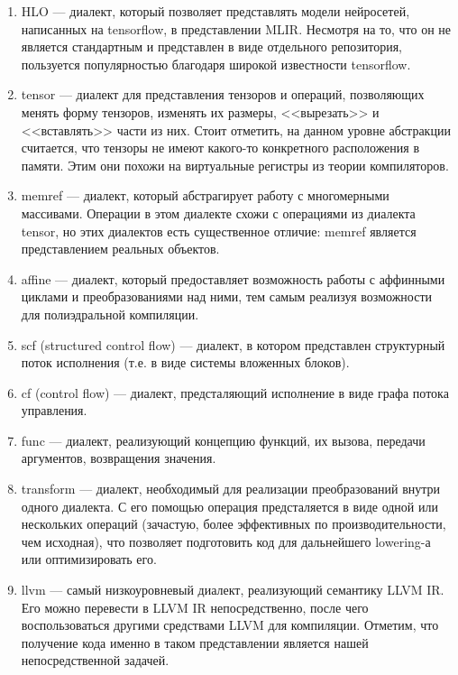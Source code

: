 \begin{enumerate}
    \item HLO --- диалект, который позволяет представлять модели нейросетей,
          написанных на tensorflow, в представлении MLIR. Несмотря на то,
          что он не является стандартным и представлен в виде отдельного
          репозитория, пользуется популярностью благодаря широкой
          известности tensorflow.

    \item tensor --- диалект для представления тензоров и операций,
          позволяющих менять форму тензоров, изменять их размеры,
          <<вырезать>> и <<вставлять>> части из них. Стоит отметить, на
          данном уровне абстракции считается, что тензоры не имеют какого-то
          конкретного расположения в памяти. Этим они похожи на виртуальные
          регистры из теории компиляторов.

    \item memref --- диалект, который абстрагирует работу с многомерными
          массивами. Операции в этом диалекте схожи с операциями из диалекта
          tensor, но этих диалектов есть существенное отличие: memref является
          представлением реальных объектов.

    \item affine --- диалект, который предоставляет возможность работы с
          аффинными циклами и преобразованиями над ними, тем самым реализуя
          возможности для полиэдральной компиляции.

    \item scf (structured control flow) --- диалект, в котором представлен
          структурный поток исполнения (т.е. в виде системы вложенных блоков).

    \item cf (control flow) --- диалект, предсталяющий исполнение в виде графа
          потока управления.

    \item func --- диалект, реализующий концепцию функций, их вызова, передачи
          аргументов, возвращения значения.

    \item transform --- диалект, необходимый для реализации преобразований
          внутри одного диалекта. С его помощью операция предсталяется в виде
          одной или нескольких операций (зачастую, более эффективных по
          производительности, чем исходная), что позволяет подготовить код
          для дальнейшего lowering-а или оптимизировать его.

    \item llvm --- самый низкоуровневый диалект, реализующий семантику LLVM IR.
          Его можно перевести в LLVM IR непосредственно, после чего
          воспользоваться другими средствами LLVM для компиляции. Отметим, что
          получение кода именно в таком представлении является нашей
          непосредственной задачей.
\end{enumerate}

